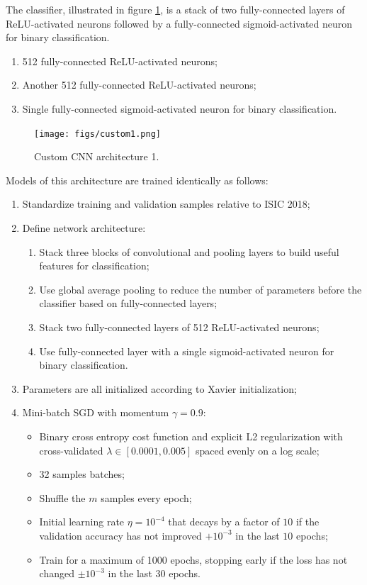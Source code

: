 The classifier, illustrated in figure \ref{fig:custom1}, is a stack of two fully-connected layers of ReLU-activated neurons followed by a fully-connected sigmoid-activated neuron for binary classification.

\begin{enumerate}
    \item 512 fully-connected ReLU-activated neurons;
    \item Another 512 fully-connected ReLU-activated neurons;
    \item Single fully-connected sigmoid-activated neuron for binary classification.
\end{enumerate}

\begin{figure}[ht]
    \centering
    \texttt{[image: figs/custom1.png]}
    \caption{Custom \ac{CNN} architecture 1.}
    \label{fig:custom1}
\end{figure}

Models of this architecture are trained identically as follows:

\begin{enumerate}
    \item Standardize training and validation samples relative to \ac{ISIC} 2018;
    \item Define network architecture:
        \begin{enumerate}
            \item Stack three blocks of convolutional and pooling layers to build useful features for classification;
            \item Use global average pooling to reduce the number of parameters before the classifier based on fully-connected layers;
            \item Stack two fully-connected layers of 512 ReLU-activated neurons;
            \item Use fully-connected layer with a single sigmoid-activated neuron for binary classification.
        \end{enumerate}
    \item Parameters are all initialized according to Xavier initialization;
    \item Mini-batch \ac{SGD} with momentum $\gamma = 0.9$:
        \begin{itemize}
            \item Binary cross entropy cost function and explicit L2 regularization with cross-validated $\lambda \in [0.0001, 0.005]$ spaced evenly on a log scale;
            \item 32 samples batches;
            \item Shuffle the $m$ samples every epoch;
            \item Initial learning rate $\eta = 10^{-4}$ that decays by a factor of $10$ if the validation accuracy has not improved $+10^{-3}$ in the last $10$ epochs;
            \item Train for a maximum of 1000 epochs, stopping early if the loss has not changed $\pm 10^{-3}$ in the last $30$ epochs.
        \end{itemize}
\end{enumerate}

